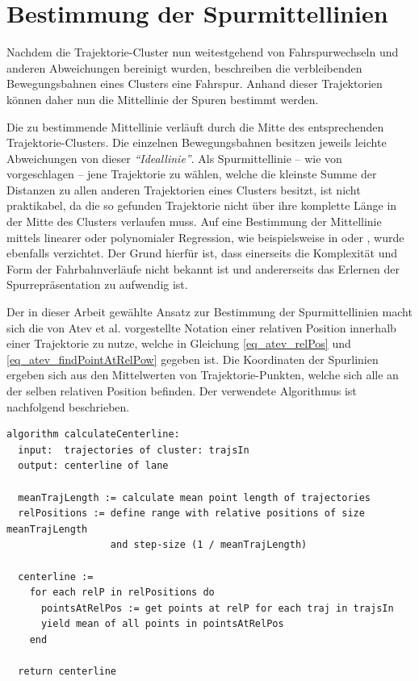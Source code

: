 \section{Bestimmung der Spurmittellinien}
\label{sec:real2_define_lane_centerline}

Nachdem die Trajektorie-Cluster nun weitestgehend von Fahrspurwechseln und anderen Abweichungen bereinigt
wurden, beschreiben die verbleibenden Bewegungsbahnen eines Clusters eine Fahrspur.
Anhand dieser Trajektorien können daher nun die Mittellinie der Spuren bestimmt werden.

Die zu bestimmende Mittellinie verläuft durch die Mitte des entsprechenden
Trajektorie-Clusters. Die einzelnen Bewegungsbahnen besitzen jeweils leichte Abweichungen von dieser
\textit{``Ideallinie''}.
Als Spurmittellinie -- wie von \cite{Hu2005} vorgeschlagen -- jene Trajektorie zu wählen, welche die
kleinste Summe der Distanzen zu allen anderen Trajektorien eines Clusters besitzt, ist nicht praktikabel,
da die so gefunden Trajektorie nicht über ihre komplette Länge in der Mitte des Clusters verlaufen muss.
Auf eine Bestimmung der Mittellinie mittels linearer oder polynomialer Regression, wie beispielsweise in
\cite[]{Chen2014} oder \cite[]{Melo2006},
wurde ebenfalls verzichtet. Der Grund hierfür ist, dass einerseits die Komplexität und Form der Fahrbahnverläufe
nicht bekannt ist und andererseits das Erlernen der Spurrepräsentation zu aufwendig ist.

Der in dieser Arbeit gewählte Ansatz zur Bestimmung der Spurmittellinien macht sich die von Atev et al.
vorgestellte Notation einer relativen Position innerhalb einer Trajektorie zu nutze, welche in
Gleichung \ref{eq_atev_relPos} und \ref{eq_atev_findPointAtRelPow} gegeben ist.
Die Koordinaten der Spurlinien ergeben sich aus den Mittelwerten von Trajektorie-Punkten, welche sich
alle an der selben relativen Position befinden. Der verwendete Algorithmus ist nachfolgend beschrieben.
\begin{lstlisting}[caption=Pseudocode Cluster Post-Processing, language=Pseudo, label=lst:pseudo_post_processing]
algorithm calculateCenterline:
  input:  trajectories of cluster: trajsIn
  output: centerline of lane

  meanTrajLength := calculate mean point length of trajectories
  relPositions := define range with relative positions of size meanTrajLength
                  and step-size (1 / meanTrajLength)

  centerline :=
    for each relP in relPositions do
      pointsAtRelPos := get points at relP for each traj in trajsIn
      yield mean of all points in pointsAtRelPos
    end

  return centerline
\end{lstlisting}

